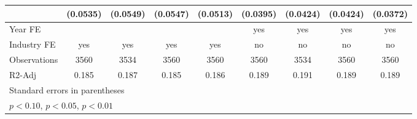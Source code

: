 \begin{table}[htbp]
\begin{tabular}{l*{8}{c}}
                    &    (0.0535)         &    (0.0549)         &    (0.0547)         &    (0.0513)         &    (0.0395)         &    (0.0424)         &    (0.0424)         &    (0.0372)         \\
\hline
Year FE             &                     &                     &                     &                     &         yes         &         yes         &         yes         &         yes         \\
Industry FE         &         yes         &         yes         &         yes         &         yes         &          no         &          no         &          no         &          no         \\
Observations        &        3560         &        3534         &        3560         &        3560         &        3560         &        3534         &        3560         &        3560         \\
R2-Adj              &       0.185         &       0.187         &       0.185         &       0.186         &       0.189         &       0.191         &       0.189         &       0.189         \\
\hline\hline
\multicolumn{9}{l}{\footnotesize Standard errors in parentheses}\\
\multicolumn{9}{l}{\footnotesize \sym{*} \(p<0.10\), \sym{**} \(p<0.05\), \sym{***} \(p<0.01\)}\\
\end{tabular}
\end{table}
